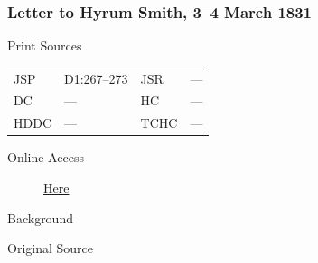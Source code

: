 		\subsubsection{Letter to Hyrum Smith, 3--4 March 1831}
			\label{EMS-1831-JS-3-4-MAR-1831}
		
			\begin{description}
				\item[Print Sources]
			\end{description}

				\begin{tabular}{p{0.5in}p{1in}p{0.5in}p{1in}}
				JSP	 	& D1:267--273	& JSR 		& --- \\
				DC	 	& ---		 	& HC 		& --- \\
				HDDC 	& ---			& TCHC 		& --- \\
				\end{tabular}
			
			\begin{description}
				\item[Online Access] \href{https://www.josephsmithpapers.org/paper-summary/letter-to-hyrum-smith-3-4-march-1831/1}{Here}
			\end{description}
			
			\begin{description}
				\item[Background]
			\end{description}
			
			
			\begin{description}
				\item[Original Source]
			\end{description}
			
			
